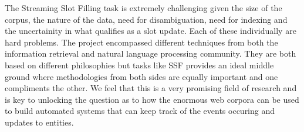 The Streaming Slot Filling task is extremely challenging given the size of the corpus, the nature of the data, need for disambiguation, need for indexing and the uncertainity in what qualifies as a slot update. Each of these individually are hard problems. The project encompassed different techniques from both the information retrieval and natural language processing community. They are both based on different philosophies but tasks like SSF provides an ideal middle ground where methodologies from both sides are equally important and one compliments the other. We feel that this is a very promising field of research and is key to unlocking the question as to how the enormous web corpora can be used to build automated systems that can keep track of the events occuring and updates to entities.
